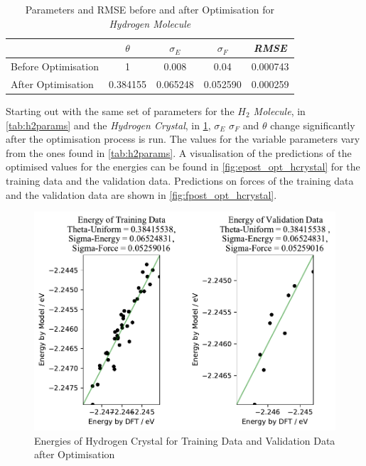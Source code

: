 \begin{table}
\centering
  \begin{tabular}{|l|c|c|c|c|}
    \hline
     & $\theta$ & $\sigma_E$ & $\sigma_F$  & \textit{RMSE} \\
    \hline
    Before Optimisation & 1 & 0.008 & 0.04 & 0.000743
 \\
    After Optimisation &  0.384155 & 0.065248 &  0.052590 & 0.000259
 \\
    \hline
  \end{tabular}
\caption{Parameters and RMSE before and after Optimisation for \textit{Hydrogen Molecule}}
\label{tab:hcrystalparams}
\end{table}


Starting out with the same set of parameters for the \textit{$H_2$ Molecule}, in   \ref{tab:h2params} and the \textit{Hydrogen Crystal}, in \ref{tab:hcrystalparams}, $\sigma_E$ $\sigma_F$ and $\theta$ change significantly after the optimisation process is run. The values for the variable parameters vary from the ones found in \ref{tab:h2params}. A visualisation of the predictions of the optimised values for the energies can be found in \ref{fig:epost_opt_hcrystal} for the training data and the validation data. Predictions on forces of the training data  and the validation data are shown in \ref{fig:fpost_opt_hcrystal}.




\begin{figure}
	\includegraphics{../Bilder/Opt_Energies_HCrystal.pdf}
	\caption{Energies of Hydrogen Crystal for Training Data and Validation Data after Optimisation}
	\label{epost_opt_hcrystal}
\end{figure}

